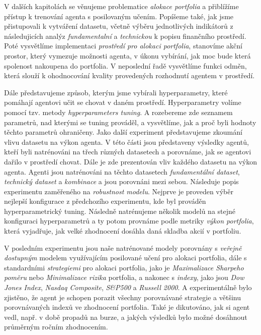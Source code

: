 {{        V dalších kapitolách se věnujeme problematice \emph{alokace portfolia} a přiblížíme přístup k trenování agenta s posilovaným učením. Popíšeme také, jak jsme přistupovali k vytváření datasetu, včetně výběru jednotlivých indikátorů z následujicích analýz \emph{fundamentalní} a \emph{technickou} k popisu finančního prostředí. Poté vysvětlíme implementaci \emph{prostředí pro alokaci portfolia}, stanovíme akční prostor, který vymezuje možnosti agenta, v úkonu vybírání, jak moc bude která spolenost nakoupena do portfolia. V neposlední řadě vysvětlíme funkci odměn, která slouží k ohodnocování kvality provedených rozhodnutí agentem v prostředí.

        Dále představujeme způsob, kterým jsme vybírali hyperparametry, které pomáhají agentovi učit se chovat v daném prostředí. Hyperparametry volíme pomocí tzv. metody \emph{hyperparameters tuning}. A rozebereme zde seznamem parametrů, nad kterými se tuning prováděl, a vysvětlíme, jak a proč byli hodnoty těchto parametrů ohraničeny. Jako další experiment představujeme zkoumání vlivu datasetu na výkon agenta. V této části jsou představeny výsledky agentů, kteří byli natrénováni na třech různých datasetech a porovnáme, jak se agentovi dařilo v prostředí chovat. Dále je zde prezentován vliv každého datasetu na výkon agenta. Agenti jsou natrénováni na těchto datasetech \emph{fundamentální dataset}, \emph{technický dataset} a \emph{kombinace} a jsou porovnáni mezi sebou. Následuje popis experimentu zaměřeného na \emph{robustnost modelu}. Nejprve je proveden výběr nejlepší konfigurace z předchozího experimentu, kde byl prováděn hyperparametrický tuning. Následně natrénujeme několik modelů na stejné konfiguraci hyperparametrů a ty potom provnáme podle metriky \emph{výkon portfolia}, která vyjadřuje, jak velké zhodnocení dosáhla daná skladba akcií v portfoliu.

        V posledním experimentu jsou naše natrénované modely porovnány s \emph{veřejně dostupným} modelem využívajícím posilované učení pro alokaci portfolia, dále s standardními \emph{strategiemi} pro alokaci portfolia, jako je \emph{Maximalizace Sharpeho poměru} nebo \emph{Minimalizace rizika} portfolia, a nakonec s \emph{indexy}, jako jsou \emph{Dow Jones Index}, \emph{Nasdaq Composite}, \emph{S\&P500} a \emph{Russell 2000}. A experimentálně bylo zjistěno, že agent je schopen porazit všechny porovnávané strategie a většinu porovnávaných indexů ve zhodnocení portfolia. Také je dikutováno, jak si agent vedl, např. v době propadů na burze, a jakých výsledků bylo možné dosáhnout průměrným ročním zhodnocením.

}}
